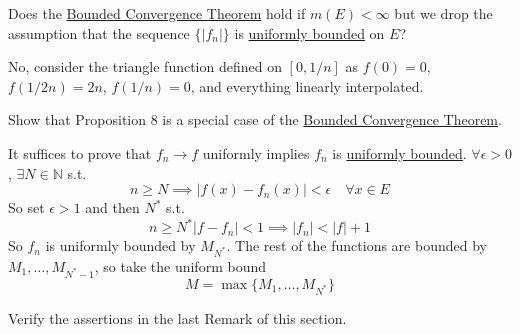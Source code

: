   \begin{exercise}[Royden 4.13]
    Does the \hyperref[thm:bounded-convergence-theorem]{Bounded Convergence Theorem} hold if $m(E) < \infty$ but we drop the assumption that the sequence $\{|f_n|\}$ is \hyperref[real-def:uniformly-bounded]{uniformly bounded} on $E$?
  \end{exercise}
  \begin{solution}
    No, consider the triangle function defined on $[0, 1/n]$ as $f(0) = 0$, $f(1/2n) = 2n$, $f(1/n) = 0$, and everything linearly interpolated. 
  \end{solution}

  \begin{exercise}[Royden 4.14]
    Show that Proposition 8 is a special case of the \hyperref[thm:bounded-convergence-theorem]{Bounded Convergence Theorem}.
  \end{exercise}
  \begin{solution}
    It suffices to prove that $f_n \to f$ uniformly implies $f_n$ is \hyperref[real-def:uniformly-bounded]{uniformly bounded}. $\forall \epsilon > 0$, $\exists N \in \mathbb{N}$ s.t. 
    \begin{equation}
      n \geq N \implies |f(x) - f_n (x)| < \epsilon \quad \forall x \in E
    \end{equation}
    So set $\epsilon > 1$ and then $N^\ast$ s.t. 
    \begin{equation}
      n \geq N^\ast |f - f_n| < 1 \implies |f_n| < |f| + 1
    \end{equation}
    So $f_n$ is uniformly bounded by $M_{N^\ast}$. The rest of the functions are bounded by $M_1, \ldots, M_{N^\ast - 1}$, so take the uniform bound 
    \begin{equation}
      M = \max \{M_1, \ldots, M_{N^\ast}\}
    \end{equation}
  \end{solution}

  \begin{exercise}[Royden 4.15]
    Verify the assertions in the last Remark of this section.
  \end{exercise}

